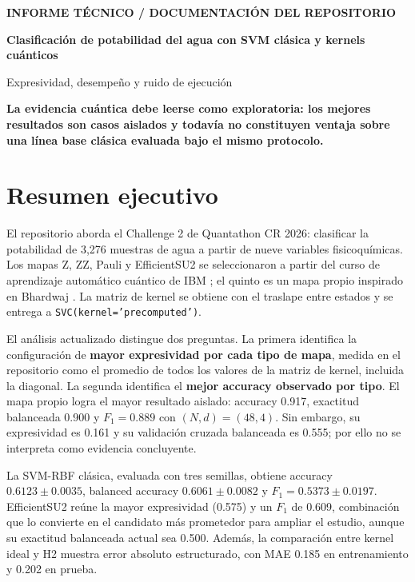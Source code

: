 \documentclass[9pt,a4paper]{extarticle}
\newcommand{\callout}[1]{\begin{center}\colorbox{pale}{\parbox{0.94\linewidth}{\centering\color{navy}\textbf{#1}}}\end{center}}
\begin{document}
{\color{blue}\bfseries\small INFORME TÉCNICO / DOCUMENTACIÓN DEL REPOSITORIO}\par
\vspace{2mm}
{\color{navy}\bfseries\fontsize{21}{23}\selectfont Clasificación de potabilidad del agua con SVM clásica y kernels cuánticos}\par
\vspace{2mm}
{\color{muted}\large Expresividad, desempeño y ruido de ejecución}\par
\vspace{3mm}

\callout{La evidencia cuántica debe leerse como exploratoria: los mejores resultados son casos aislados y todavía no constituyen ventaja sobre una línea base clásica evaluada bajo el mismo protocolo.}

\section*{Resumen ejecutivo}
El repositorio aborda el Challenge 2 de Quantathon CR 2026: clasificar la potabilidad de 3,276 muestras de agua a partir de nueve variables fisicoquímicas. Los mapas Z, ZZ, Pauli y EfficientSU2 se seleccionaron a partir del curso de aprendizaje automático cuántico de IBM \cite{ibm}; el quinto es un mapa propio inspirado en Bhardwaj \cite{custom_fm}. La matriz de kernel se obtiene con el traslape entre estados y se entrega a \texttt{SVC(kernel='precomputed')}.

El análisis actualizado distingue dos preguntas. La primera identifica la configuración de \textbf{mayor expresividad por cada tipo de mapa}, medida en el repositorio como el promedio de todos los valores de la matriz de kernel, incluida la diagonal. La segunda identifica el \textbf{mejor accuracy observado por tipo}. El mapa propio logra el mayor resultado aislado: accuracy 0.917, exactitud balanceada 0.900 y $F_1=0.889$ con $(N,d)=(48,4)$. Sin embargo, su expresividad es 0.161 y su validación cruzada balanceada es 0.555; por ello no se interpreta como evidencia concluyente.

La SVM-RBF clásica, evaluada con tres semillas, obtiene accuracy $0.6123\pm0.0035$, balanced accuracy $0.6061\pm0.0082$ y $F_1=0.5373\pm0.0197$. EfficientSU2 reúne la mayor expresividad (0.575) y un $F_1$ de 0.609, combinación que lo convierte en el candidato más prometedor para ampliar el estudio, aunque su exactitud balanceada actual sea 0.500. Además, la comparación entre kernel ideal y H2 muestra error absoluto estructurado, con MAE 0.185 en entrenamiento y 0.202 en prueba.
\end{document}
